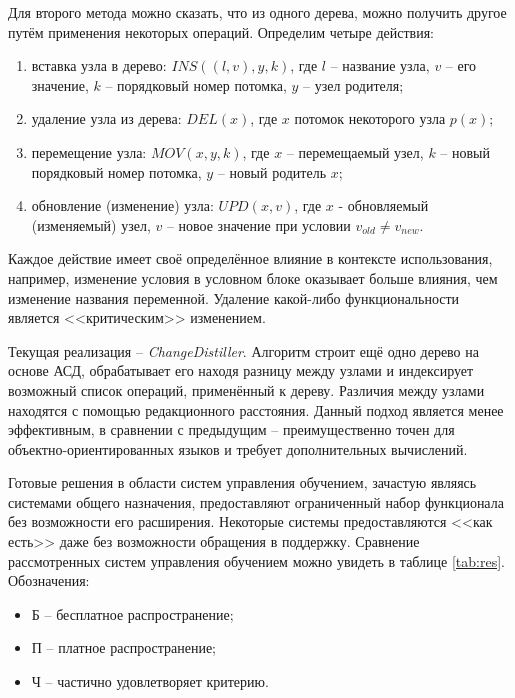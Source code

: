 Для второго метода можно сказать, что из одного дерева, можно получить другое путём применения некоторых операций. Определим четыре действия\cite{ast-op-values}:
\begin{enumerate}
	\item вставка узла в дерево: $INS((l,v),y,k)$, где $l$ -- название узла, $v$ -- его значение, $k$ -- порядковый номер потомка, $y$ -- узел родителя;
	\item удаление узла из дерева: $DEL(x)$, где $x$ потомок некоторого узла $p(x)$;
	\item перемещение узла: $MOV(x,y,k)$, где $x$ -- перемещаемый узел, $k$ -- новый порядковый номер потомка, $y$ -- новый родитель $x$;
	\item обновление (изменение) узла: $UPD(x, v)$, где $x$ - обновляемый (изменяемый) узел, $v$ -- новое значение при условии $v_{old}\neq v_{new}$.
\end{enumerate}

Каждое действие имеет своё определённое влияние в контексте использования, например, изменение условия в условном блоке оказывает больше влияния, чем изменение названия переменной. Удаление какой-либо функциональности является <<критическим>> изменением. 

Текущая реализация -- \textit{ChangeDistiller}\cite{change-distiller}. Алгоритм строит ещё одно дерево на основе АСД, обрабатывает его находя разницу между узлами и индексирует возможный список операций, применённый к дереву. Различия между узлами находятся с помощью редакционного расстояния\cite{levenshtein}. Данный подход является менее эффективным, в сравнении с предыдущим -- преимущественно точен для объектно-ориентированных языков и требует дополнительных вычислений.

\clearpage


Готовые решения в области систем управления обучением, зачастую являясь системами общего назначения, предоставляют ограниченный набор функционала без возможности его расширения. Некоторые системы предоставляются <<как есть>> даже без возможности обращения в поддержку. Сравнение рассмотренных систем управления обучением можно увидеть в таблице \ref{tab:res}. Обозначения:
\begin{itemize}
	\item Б -- бесплатное распространение;
	\item П -- платное распространение;
	\item Ч -- частично удовлетворяет критерию.
\end{itemize}

